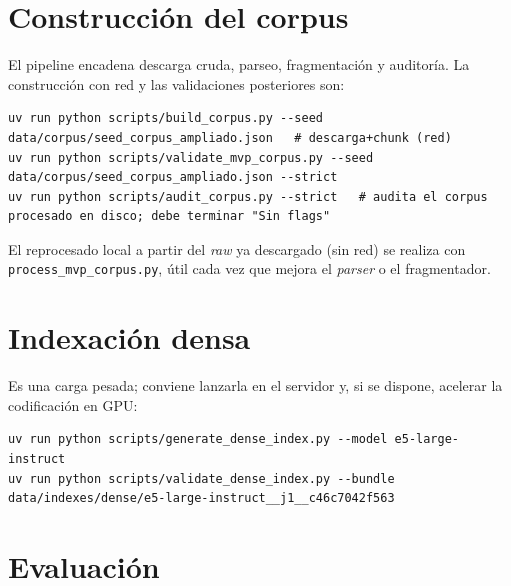 \section{Construcción del corpus}
\label{sec:app-corpus}

El pipeline encadena descarga cruda, parseo, fragmentación y auditoría. La construcción con red y las validaciones posteriores son:

\begin{lstlisting}
uv run python scripts/build_corpus.py --seed data/corpus/seed_corpus_ampliado.json   # descarga+chunk (red)
uv run python scripts/validate_mvp_corpus.py --seed data/corpus/seed_corpus_ampliado.json --strict
uv run python scripts/audit_corpus.py --strict   # audita el corpus procesado en disco; debe terminar "Sin flags"
\end{lstlisting}

El reprocesado local a partir del \emph{raw} ya descargado (sin red) se realiza con \texttt{process\_mvp\_corpus.py}, útil cada vez que mejora el \emph{parser} o el fragmentador.

\section{Indexación densa}
\label{sec:app-indexacion}

Es una carga pesada; conviene lanzarla en el servidor y, si se dispone, acelerar la codificación en GPU:

\begin{lstlisting}
uv run python scripts/generate_dense_index.py --model e5-large-instruct
uv run python scripts/validate_dense_index.py --bundle data/indexes/dense/e5-large-instruct__j1__c46c7042f563
\end{lstlisting}

\section{Evaluación}
\label{sec:app-evaluacion}

